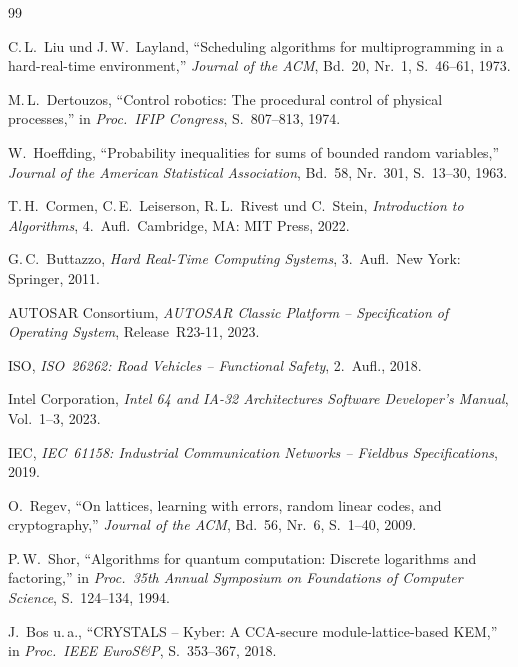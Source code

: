 ﻿\documentclass[a4paper,12pt]{scrreprt}
\theoremstyle{definition}
\begin{document}
	\begin{thebibliography}{99}
		
		C.\,L.\ Liu und J.\,W.\ Layland,
		``Scheduling algorithms for multiprogramming in a hard-real-time environment,''
		\textit{Journal of the ACM}, Bd.~20, Nr.~1, S.~46--61, 1973.
		
		M.\,L.\ Dertouzos,
		``Control robotics: The procedural control of physical processes,''
		in \textit{Proc.\ IFIP Congress}, S.~807--813, 1974.
		
		W.\ Hoeffding,
		``Probability inequalities for sums of bounded random variables,''
		\textit{Journal of the American Statistical Association}, Bd.~58, Nr.~301,
		S.~13--30, 1963.
		
		T.\,H.\ Cormen, C.\,E.\ Leiserson, R.\,L.\ Rivest und C.\ Stein,
		\textit{Introduction to Algorithms},
		4.~Aufl.\ Cambridge, MA: MIT Press, 2022.
		
		G.\,C.\ Buttazzo,
		\textit{Hard Real-Time Computing Systems},
		3.~Aufl.\ New York: Springer, 2011.
		
		AUTOSAR Consortium,
		\textit{AUTOSAR Classic Platform -- Specification of Operating System},
		Release~R23-11, 2023.
		
		ISO,
		\textit{ISO~26262: Road Vehicles -- Functional Safety},
		2.~Aufl., 2018.
		
		Intel Corporation,
		\textit{Intel\textregistered{} 64 and IA-32 Architectures Software
			Developer's Manual}, Vol.~1--3, 2023.
		
		IEC,
		\textit{IEC~61158: Industrial Communication Networks -- Fieldbus
			Specifications}, 2019.
		
		O.\ Regev,
		``On lattices, learning with errors, random linear codes, and cryptography,''
		\textit{Journal of the ACM}, Bd.~56, Nr.~6, S.~1--40, 2009.
		
		P.\,W.\ Shor,
		``Algorithms for quantum computation: Discrete logarithms and factoring,''
		in \textit{Proc.\ 35th Annual Symposium on Foundations of Computer Science},
		S.~124--134, 1994.
		
		J.\ Bos u.\,a.,
		``CRYSTALS -- Kyber: A CCA-secure module-lattice-based KEM,''
		in \textit{Proc.\ IEEE EuroS\&P}, S.~353--367, 2018.
		

\end{thebibliography}
\end{document}
